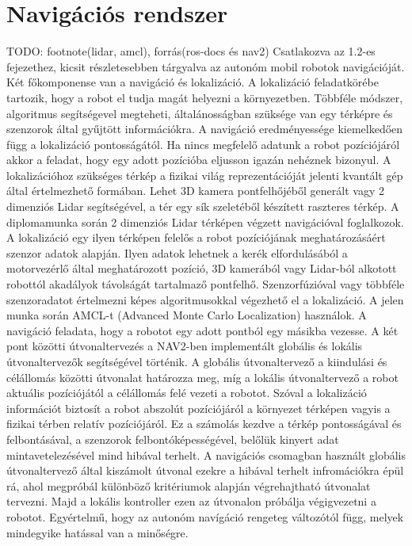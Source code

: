 \section{Navigációs rendszer}
TODO: footnote(lidar, amcl), forrás(ros-docs és nav2)
Csatlakozva az 1.2-es fejezethez, kicsit részletesebben tárgyalva az autonóm mobil robotok navigációját. Két főkomponense van a navigáció és lokalizáció. A lokalizáció feladatkörébe tartozik, hogy a robot el tudja magát helyezni a környezetben. Többféle módszer, algoritmus segítségevel megteheti, általánosságban szüksége van egy térképre és szenzorok által gyűjtött információkra. A navigáció eredményessége kiemelkedően függ a lokalizáció pontosságától. Ha nincs megfelelő adatunk a robot pozíciójáról akkor a feladat, hogy egy adott pozícióba eljusson igazán nehéznek bizonyul. A lokalizációhoz szükséges térkép a fizikai világ reprezentációját jelenti kvantált gép által értelmezhető formában. Lehet 3D kamera pontfelhőjéből generált vagy 2 dimenziós Lidar segítségével, a tér egy sík szeletéből készített raszteres térkép. A diplomamunka során 2 dimenziós Lidar térképen végzett navigációval foglalkozok. A lokalizáció egy ilyen térképen felelős a robot pozíciójának meghatározásáért szenzor adatok alapján. Ilyen adatok lehetnek a kerék elfordulásából a motorvezérlő által meghatározott pozíció, 3D kamerából vagy Lidar-ból alkotott robottól akadályok távolságát tartalmaző pontfelhő. Szenzorfúzióval vagy többféle szenzoradatot értelmezni képes algoritmusokkal végezhető el a lokalizáció. A jelen munka során AMCL-t (Advanced Monte Carlo Localization) használok. A navigáció feladata, hogy a robotot egy adott pontból egy másikba vezesse. A két pont közötti útvonaltervezés a NAV2-ben implementált globális és lokális útvonaltervezők segítségével történik. A globális útvonaltervező a kiindulási és célállomás közötti útvonalat határozza meg, míg a lokális útvonaltervező a robot aktuális pozíciójától a célállomás felé vezeti a robotot. Szóval a lokalizáció információt biztosít a robot abszolút pozíciójáról a környezet térképen vagyis a fizikai térben relatív pozíciójáról. Ez a számolás kezdve a térkép pontosságával és felbontásával, a szenzorok felbontóképességével, belőlük kinyert adat mintavetelezésével mind hibával terhelt. A navigációs csomagban használt globális útvonaltervező által kiszámolt útvonal ezekre a hibával terhelt infromációkra épül rá, ahol megpróbál különböző kritériumok alapján végrehajtható útvonalat tervezni. Majd a lokális kontroller ezen az útvonalon próbálja végigvezetni a robotot. Egyértelmű, hogy az autonóm navígáció rengeteg változótól függ, melyek mindegyike hatással van a minőségre.

